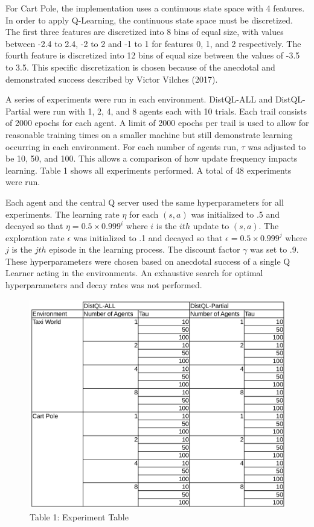 \documentclass[jair,twoside,11pt,theapa]{article}
\begin{document}
For Cart Pole, the implementation uses a continuous state space with 4 features. In order to apply Q-Learning, the continuous state space must be discretized. The first three features are discretized into 8 bins of equal size, with values between -2.4 to 2.4, -2 to 2 and -1 to 1 for features 0, 1, and 2 respectively. The fourth feature is discretized into 12 bins of equal size between the values of -3.5 to 3.5. This specific discretization is chosen because of the anecdotal and demonstrated success described by Victor Vilches (2017)\nocite{Victor:github}. 

A series of experiments were run in each environment. DistQL-ALL and DistQL-Partial were run with 1, 2, 4, and 8 agents each with 10 trials. Each trail consists of 2000 epochs for each agent. A limit of 2000 epochs per trail is used to allow for reasonable training times on a smaller machine but still demonstrate learning occurring in each environment. For each number of agents run, $\tau$ was adjusted to be 10, 50, and 100. This allows a comparison of how update frequency impacts learning. Table 1 shows all experiments performed. A total of 48 experiments were run. 

Each agent and the central Q server used the same hyperparameters for all experiments. The learning rate $\eta$ for each $(s,a)$ was initialized to .5 and decayed so that $\eta = 0.5 \times 0.999^i$ where $i$ is the $ith$ update to $(s,a)$. The exploration rate $\epsilon$ was initialized to .1 and decayed so that $\epsilon = 0.5 \times 0.999^j$ where $j$ is the $jth$ episode in the learning process. The discount factor $\gamma$ was set to .9. These hyperparameters were chosen based on anecdotal success of a single Q Learner acting in the environments. An exhaustive search for optimal hyperparameters and decay rates was not performed. 

\begin{figure}[h]
\centering
\includegraphics[width=0.7\linewidth]{ExperimentTable}
\caption*{Table 1: Experiment Table}
\label{fig:ExperimentTable}
\end{figure}
\end{document}
